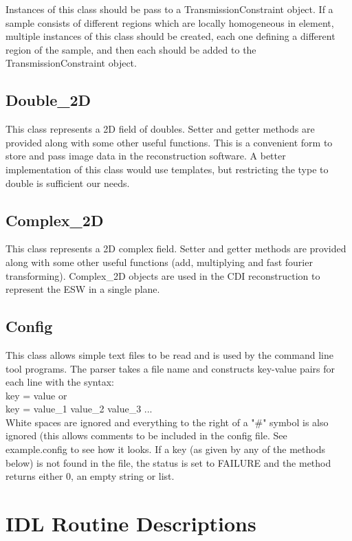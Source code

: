 \documentclass[]{cxs-software}
\begin{document}
Instances of this class should be pass to a TransmissionConstraint
object. If a sample consists of different regions which are locally
homogeneous in element, multiple instances of this class should be
created, each one defining a different region of the sample, and then
each should be added to the TransmissionConstraint object.

\subsection{Double\_2D}
This class represents a 2D field of doubles. Setter and getter methods
are provided along with some other useful functions. This is a
convenient form to store and pass image data in the reconstruction
software. A better implementation of this class would use templates,
but restricting the type to double is sufficient our needs.

\subsection{Complex\_2D}
This class represents a 2D complex field. Setter and getter methods
are provided along with some other useful functions (add, multiplying
and fast fourier transforming). Complex\_2D objects are used in the CDI
reconstruction to represent the ESW in a single plane.

\subsection{Config}
This class allows simple text files to be read and is used by the
command line tool programs. The parser takes a file name and
constructs key-value pairs for each line with the syntax:\\ 
key = value or \\
key = value\_1 value\_2 value\_3 ... \\
White spaces are ignored and everything to the right of a "\#" symbol
is also ignored (this allows comments to be included in the config
file. See example.config to see how it looks. If a key (as given by
any of the methods below) is not found in the file, the status is set
to FAILURE and the method returns either 0, an empty string or list.


\section{IDL Routine Descriptions}
\end{document}
